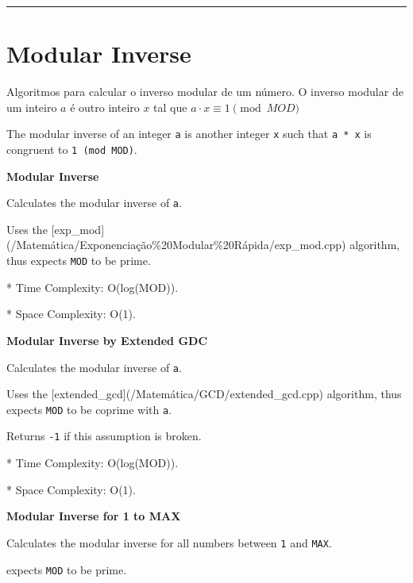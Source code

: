 \documentclass[11pt, a4paper, twoside]{book}
\begin{document}
\hfill

\rule{\textwidth}{0.4pt}

\section{Modular Inverse}



Algoritmos para calcular o inverso modular de um número. O inverso modular de um inteiro $a$ é outro inteiro $x$ tal que $a \cdot x \equiv 1 \pmod{MOD}$



The modular inverse of an integer \lstinline{a} is another integer \lstinline{x} such that \lstinline{a * x} is congruent to \lstinline{1 (mod MOD)}.



\textbf{Modular Inverse} 



Calculates the modular inverse of \lstinline{a}.



Uses the [exp\_mod](/Matemática/Exponenciação\%20Modular\%20Rápida/exp\_mod.cpp) algorithm, thus expects \lstinline{MOD} to be prime.



* Time Complexity: O(log(MOD)).

* Space Complexity: O(1).



\textbf{Modular Inverse by Extended GDC} 



Calculates the modular inverse of \lstinline{a}.



Uses the [extended\_gcd](/Matemática/GCD/extended\_gcd.cpp) algorithm, thus expects \lstinline{MOD} to be coprime with \lstinline{a}.



Returns \lstinline{-1} if this assumption is broken.



* Time Complexity: O(log(MOD)).

* Space Complexity: O(1).



\textbf{Modular Inverse for 1 to MAX} 



Calculates the modular inverse for all numbers between \lstinline{1} and \lstinline{MAX}.



expects \lstinline{MOD} to be prime.
\end{document}

